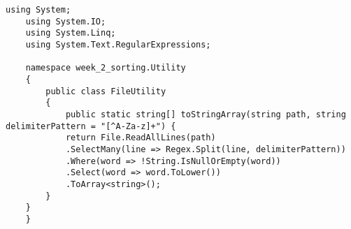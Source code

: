 \documentclass[../template/template.tex]{subfiles}
\begin{document}
\begin{lstlisting}[language={[Sharp]C}, caption={C\# File Utility}, label={class}]
    using System;
    using System.IO;
    using System.Linq;
    using System.Text.RegularExpressions;

    namespace week_2_sorting.Utility
    {
        public class FileUtility
        {
            public static string[] toStringArray(string path, string delimiterPattern = "[^A-Za-z]+") {
            return File.ReadAllLines(path)
            .SelectMany(line => Regex.Split(line, delimiterPattern))
            .Where(word => !String.IsNullOrEmpty(word))
            .Select(word => word.ToLower())
            .ToArray<string>();
        }
    }
    }
\end{lstlisting}
\end{document}
